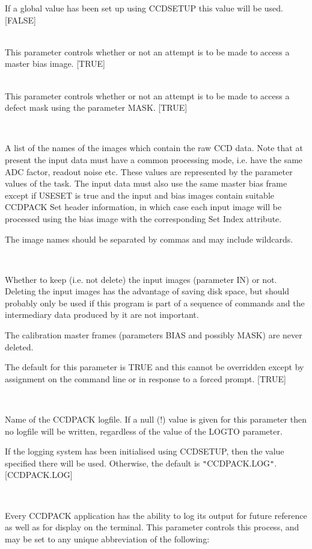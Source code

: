 \documentclass[twoside,11pt]{article}
\newcommand{\htmlref}[2]{#1}
\renewcommand{\_}{\texttt{\symbol{95}}}
\newcommand{\qt}[1]{{\tt "}#1{\tt "}}
\newcommand{\xroutine}[1]{\htmlref{{\sc #1}}{#1}}
\newcommand{\sstsubsection}[1]{ \item[{#1}] \mbox{} \\}
\newcommand{\sstitemlist}[1]{
  \mbox{} \\
  \vspace{-3.5ex}
  \begin{itemize}
     #1
  \end{itemize}
}
\newcommand{\sstsubsection}[1]{\item[{#1}]}
\newcommand{\sstitemlist}[1]{
      \begin{itemize}
         #1
      \end{itemize}
      \\
   }
\begin{document}
{{{         If a global value has been set up using \xroutine{CCDSETUP} this value
         will be used.
         [FALSE]
      }
      \sstsubsection{
         GETBIAS = \_LOGICAL (Read)
      } {
         This parameter controls whether or not an attempt is to be made
         to access a master bias image.
         [TRUE]
      }
      \sstsubsection{
         GETMASK = \_LOGICAL (Read)
      } {
         This parameter controls whether or not an attempt is to be made
         to access a defect mask using the parameter MASK.
         [TRUE]
      }
      \sstsubsection{
         IN = LITERAL (Read)
      } {
         A list of the names of the images which contain the raw CCD
         data. Note that at present the input data must have a common
         processing mode, i.e. have the same ADC factor, readout noise
         etc. These values are represented by the parameter values of 
         the task.  The input data must also use the same master bias
         frame except if USESET is true and the input and bias images
         contain suitable CCDPACK Set header information, in which
         case each input image will be processed using the bias image
         with the corresponding Set Index attribute.

         The image names should be separated by commas and may include
         wildcards.
      }
      \sstsubsection{
         KEEPIN = \_LOGICAL (Read)
      } {
         Whether to keep (i.e. not delete) the input images (parameter IN)
         or not. Deleting the input images has the advantage of saving
         disk space, but should probably only be used if this program
         is part of a sequence of commands and the intermediary data
         produced by it are not important.

         The calibration master frames (parameters BIAS and possibly MASK)
         are never deleted.

         The default for this parameter is TRUE and this cannot be
         overridden except by assignment on the command line or in
         response to a forced prompt.
         [TRUE]
      }
      \sstsubsection{
         LOGFILE = FILENAME (Read)
      } {
         Name of the CCDPACK logfile.  If a null (!) value is given for
         this parameter then no logfile will be written, regardless of
         the value of the LOGTO parameter.

         If the logging system has been initialised using \xroutine{CCDSETUP},
         then the value specified there will be used. Otherwise, the
         default is \qt{CCDPACK.LOG}.
         [CCDPACK.LOG]
      }
      \sstsubsection{
         LOGTO = LITERAL (Read)
      } {
         Every CCDPACK application has the ability to log its output
         for future reference as well as for display on the terminal.
         This parameter controls this process, and may be set to any
         unique abbreviation of the following:
         \sstitemlist{

}}}}
\end{document}
